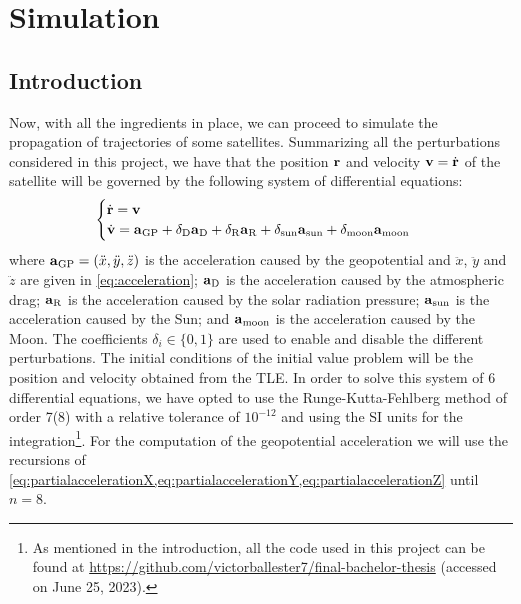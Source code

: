 \documentclass[../main.tex]{subfiles}
\begin{document}
\section{Simulation}\label{sec:simulation}
\subsection{Introduction}
Now, with all the ingredients in place, we can proceed to simulate the propagation of trajectories of some satellites.
Summarizing all the perturbations considered in this project, we have that the position $\boldsymbol{\mathrm{r}}$ and velocity $\boldsymbol{\mathrm{v}}=\dot{\boldsymbol{\mathrm{r}}}$ of the satellite will be governed by the following system of differential equations:
\begin{equation}
  \begin{cases}
    \dot{\boldsymbol{\mathrm{r}}}=\boldsymbol{\mathrm{v}} \\
    \dot{\boldsymbol{\mathrm{v}}}=\boldsymbol{\mathrm{a}}_{\mathrm{GP}} + \delta_{\mathrm{D}}\boldsymbol{\mathrm{a}}_{\mathrm{D}}+\delta_{\mathrm{R}}\boldsymbol{\mathrm{a}}_{\mathrm{R}}+\delta_{\mathrm{sun}}\boldsymbol{\mathrm{a}}_{\mathrm{sun}}+\delta_{\mathrm{moon}}\boldsymbol{\mathrm{a}}_\mathrm{moon}
  \end{cases}
\end{equation}
where $\boldsymbol{\mathrm{a}}_{\mathrm{GP}}=(\ddot{x},\ddot{y},\ddot{z})$ is the acceleration caused by the geopotential and $\ddot{x}$, $\ddot{y}$ and $\ddot{z}$ are given in \cref{eq:acceleration}; $\boldsymbol{\mathrm{a}}_{\mathrm{D}}$ is the acceleration caused by the atmospheric drag; $\boldsymbol{\mathrm{a}}_{\mathrm{R}}$ is the acceleration caused by the solar radiation pressure; $\boldsymbol{\mathrm{a}}_{\mathrm{sun}}$ is the acceleration caused by the Sun; and $\boldsymbol{\mathrm{a}}_{\mathrm{moon}}$ is the acceleration caused by the Moon. The coefficients $\delta_{i}\in\{0,1\}$ are used to enable and disable the different perturbations. The initial conditions of the initial value problem will be the position and velocity obtained from the TLE. In order to solve this system of 6 differential equations, we have opted to use the Runge-Kutta-Fehlberg method of order 7(8) with a relative tolerance of $10^{-12}$ and using the SI units for the integration\footnote{As mentioned in the introduction, all the code used in this project can be found at \url{https://github.com/victorballester7/final-bachelor-thesis} (accessed on June 25, 2023).}. For the computation of the geopotential acceleration we will use the recursions of \cref{eq:partialaccelerationX,eq:partialaccelerationY,eq:partialaccelerationZ} until $n=8$.
\end{document}

